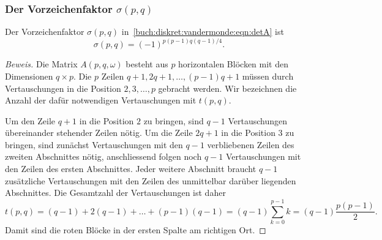 %
%
\subsubsection{Der Vorzeichenfaktor $\sigma(p,q)$}

%
%
\begin{satz}
\label{buch:diskret:faktorisierung:satz:vorzeichen}
Der Vorzeichenfaktor $\sigma(p,q)$
in~\eqref{buch:diskret:vandermonde:eqn:detA}
ist
\[
\sigma(p,q)
=
(-1)^{p(p-1)q(q-1)/4}.
\]
\end{satz}

\begin{proof}[Beweis]
Die Matrix $A(p,q,\omega)$ besteht aus $p$ horizontalen Blöcken mit den
Dimensionen $q\times p$.
Die $p$ Zeilen $q+1, 2q+1,\dots, (p-1)q+1$ müssen durch Vertauschungen
in die Position $2,3,\dots,p$ gebracht werden.
Wir bezeichnen die Anzahl der dafür notwendigen Vertauschungen mit
$t(p,q)$.

Um den Zeile $q+1$ in die Position $2$ zu bringen, sind $q-1$ 
Vertauschungen übereinander stehender Zeilen nötig.
Um die Zeile $2q+1$ in die Position $3$ zu bringen, sind
zunächst Vertauschungen mit den $q-1$ verbliebenen Zeilen des zweiten
Abschnittes nötig, anschliessend folgen noch $q-1$ Vertauschungen mit
den Zeilen des ersten Abschnittes.
Jeder weitere Abschnitt braucht $q-1$ zusätzliche Vertauschungen mit
den Zeilen des unmittelbar darüber liegenden Abschnittes.
Die Gesamtzahl der Vertauschungen ist daher
\[
t(p,q)
=
(q-1) + 2(q-1) + \dots +(p-1)(q-1)
=
(q-1)
\sum_{k=0}^{p-1} k
=
(q-1)\frac{p(p-1)}{2}.
\]
Damit sind die roten Blöcke in der ersten Spalte am richtigen Ort.


\end{proof}
